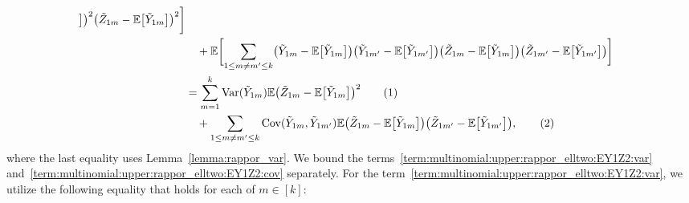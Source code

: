 \documentclass[twoside,11pt]{article}
\newcommand\numberthis{\addtocounter{equation}{1}\tag{\theequation}}
\newcommand{\rvTwo}{Y}
\newcommand{\rvThree}{Z}
\newcommand{\private}[1]{\tilde{#1}}
\newcommand{\mE}{\mathbb{E}} %
\newcommand{\alphabetSize}{k} %
\newcommand{\vectorIndex}{m}
\begin{document}
\begin{appendix}
\begin{align*}
		\bigr]
		\bigr)^2%
		\bigl( %
		\private{\rvThree}_{1 \vectorIndex}
		-
		\mE
		\bigl[
		\private{\rvTwo}_{1 \vectorIndex}
		\bigr]
		\bigr)^2%
		\biggr]
		\\  & \quad+
		\mE
		\biggl[ %
		\sum_{1 \leq \vectorIndex \neq \vectorIndex' \leq \alphabetSize} %
		\bigl( %
		\private{\rvTwo}_{1 \vectorIndex}
		- %
		\mE
		\bigl[
		\private{\rvTwo}_{1 \vectorIndex}
		\bigr]
		\bigr)%
		\bigl( %
		\private{\rvTwo}_{1 \vectorIndex'}
		- %
		\mE
		\bigl[
		\private{\rvTwo}_{1 \vectorIndex'}
		\bigr]
		\bigr)%
		\bigl( %
		\private{\rvThree}_{1 \vectorIndex}
		-
		\mE
		\bigl[
		\private{\rvTwo}_{1 \vectorIndex}
		\bigr]
		\bigr)%
		\bigl( %
		\private{\rvThree}_{1 \vectorIndex'}
		-
		\mE
		\bigl[
		\private{\rvTwo}_{1 \vectorIndex'}
		\bigr]
		\bigr)%
		\biggr]
		\\&=
		\sum_{\vectorIndex = 1}^\alphabetSize
		\mathrm{Var}(\private{Y}_{1 \vectorIndex})
		\mE
		\bigl( %
		\private{\rvThree}_{1 \vectorIndex}
		-
		\mE
		\bigl[
		\private{\rvTwo}_{1 \vectorIndex}
		\bigr]
		\bigr)^2
		\numberthis
		\label{term:multinomial:upper:rappor_elltwo:EY1Z2:var}
		\\
		&\quad+
		\sum_{1 \leq \vectorIndex \neq \vectorIndex' \leq \alphabetSize}
		\mathrm{Cov}(\private{Y}_{1 \vectorIndex}, \private{Y}_{1 \vectorIndex'})
		\mE
		\bigl( %
		\private{\rvThree}_{1 \vectorIndex}
		-
		\mE
		\bigl[
		\private{\rvTwo}_{1 \vectorIndex}
		\bigr]
		\bigr)%
		\bigl( %
		\private{\rvThree}_{1 \vectorIndex'}
		-
		\mE
		\bigl[
		\private{\rvTwo}_{1 \vectorIndex'}
		\bigr]
		\bigr),%
		\numberthis
		\label{term:multinomial:upper:rappor_elltwo:EY1Z2:cov}
	\end{align*}
	where the last equality uses Lemma~\ref{lemma:rappor_var}.
	We bound the terms~\eqref{term:multinomial:upper:rappor_elltwo:EY1Z2:var} and~\eqref{term:multinomial:upper:rappor_elltwo:EY1Z2:cov} separately.
	For the term~\eqref{term:multinomial:upper:rappor_elltwo:EY1Z2:var}, we utilize the following equality that holds for each of $\vectorIndex \in [\alphabetSize]$:

\end{appendix}
\end{document}
